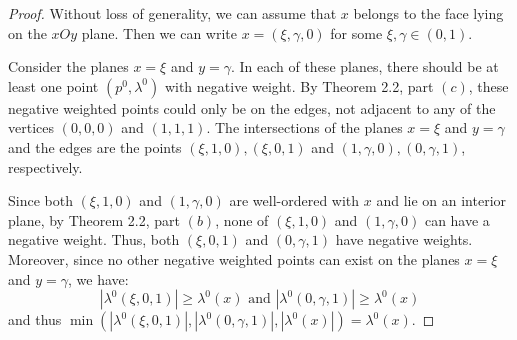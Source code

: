 \documentclass[12p]{article}
\numberwithin{equation}{section}
\begin{document}
\begin{proof}
Without loss of generality, we can assume that \(x\) belongs to the face lying on the \(xOy\) plane. Then we can write \(x=(\xi,\gamma,0)\) for some \(\xi,\gamma \in (0,1)\). 
    
Consider the planes \(x=\xi\) and \(y=\gamma \). In each of these planes, there should be at least one point \((p^0,\lambda^0)\) with negative weight. By Theorem 2.2, part \((c)\), these negative weighted points could only be on the edges, not adjacent to any of the vertices \((0,0,0)\) and \((1,1,1)\). The intersections of the planes \(x=\xi\) and \(y=\gamma \) and the edges are the points \((\xi,1,0),(\xi,0,1)\) and \((1,\gamma,0),(0,\gamma,1)\), respectively. 

Since both \((\xi,1,0)\) and \((1,\gamma,0)\) are well-ordered with \(x\) and lie on an interior plane, by Theorem 2.2, part \((b)\), none of \((\xi,1,0)\) and \((1,\gamma,0)\) can have a negative weight. Thus, both \((\xi,0,1)\) and \((0,\gamma,1)\) have negative weights. Moreover, since no other negative weighted points can exist on the planes \(x=\xi\) and \(y=\gamma \), we have:
\begin{equation*} \label{e:inequalities for weights}
|\lambda^0(\xi,0,1)|\ge \lambda^0(x)\text{ and } |\lambda^0(0,\gamma,1)| \ge \lambda^0(x)
\end{equation*}
and thus \(\min(|\lambda^0(\xi,0,1)|,|\lambda^0(0,\gamma,1)|,|\lambda^0(x)|)=\lambda^0(x)\).
     

\end{proof}
\end{document}

